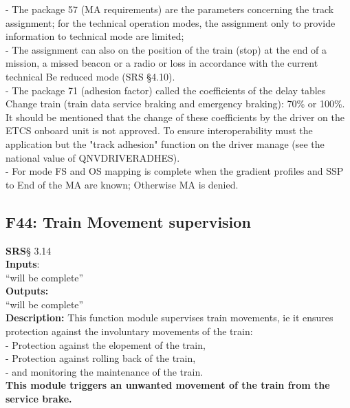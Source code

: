\documentclass{template/openetcs_report}
\begin{document}
- The package 57 (MA requirements) are the parameters concerning the track assignment; 
for the technical operation modes, the assignment only to provide information to 
technical mode are limited; \\

- The assignment can also on the position of the train (stop) at the end of a mission, 
a missed beacon or a radio or loss in accordance with the current technical 
Be reduced mode (SRS §4.10). \\

- The package 71 (adhesion factor) called the coefficients of the delay tables 
      Change train (train data service braking and emergency braking): 70\% or 100\%. 
      It should be mentioned that the change of these coefficients by the driver on the 
      ETCS onboard unit is not approved. To ensure interoperability must 
      the application but the "track adhesion" function on the driver 
      manage (see the national value of QNVDRIVERADHES). \\
      
- For mode FS and OS mapping is complete when the gradient profiles and SSP to 
End of the MA are known; Otherwise MA is denied.\\

\subsection {F44: Train Movement supervision}
 \textbf{SRS}§ 3.14 \\
 
 \textbf{Inputs}:\\
``will be complete''\\
 
 \textbf{Outputs:}\\
 ``will be complete''\\
 
 \textbf{Description:} 
This function module supervises train movements, ie it ensures protection against 
the involuntary movements of the train: \\

- Protection against the elopement of the train, \\

- Protection against rolling back of the train, \\

- and monitoring the maintenance of the train. \\

\textbf{This module triggers an unwanted movement of the train from the service brake.} \\
\end{document}
